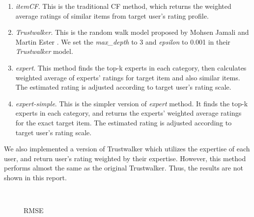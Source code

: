 \documentclass[12pt]{article}
\begin{document}
\begin{enumerate}
	\item \emph{itemCF}. This is the traditional CF method, which returns the weighted average ratings of similar items from target user's rating profile. 
	\item \emph{Trustwalker}. This is the random walk model proposed by Mohsen Jamali and Martin Ester \cite{Jamali:2009p67}. We set the \emph{max\_depth} to 3 and \emph{epsilon} to 0.001 in their \emph{Trustwalker} model.
	\item \emph{expert}. This method finds the top-k experts in each category, then calculates weighted average of experts' ratings for target item and also similar items. The estimated rating is adjusted according to target user's rating scale. 
	\item \emph{expert-simple}. This is the simpler version of \emph{expert} method. It finds the top-k experts in each category, and returns the experts' weighted average ratings for the exact target item. The estimated rating is adjusted according to target user's rating scale. 
\end{enumerate}

We also implemented a version of Trustwalker which utilizes the expertise of each user, and return user's rating weighted by their expertise. However, this method performs almost the same as the original Trustwalker. Thus, the results are not shown in this report. 

\begin{figure}[htbp]
	\centering
	\\
	\caption{RMSE}
\end{figure}
\end{document}
